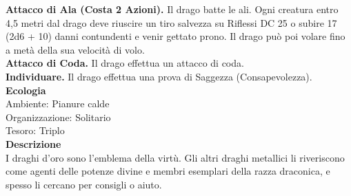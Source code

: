 \begin{multicols}{2}
\textbf{Attacco di Ala (Costa 2 Azioni).} Il drago batte le ali. Ogni creatura entro 4,5 metri dal drago deve riuscire un tiro salvezza su Riflessi DC 25 o subire 17 (2d6 + 10) danni contundenti e venir gettato prono. Il drago può poi volare fino a metà della sua velocità di volo.\\
\textbf{Attacco di Coda.} Il drago effettua un attacco di coda.\\
\textbf{Individuare.} Il drago effettua una prova di Saggezza (Consapevolezza).\\
\textbf{Ecologia}\\
Ambiente: Pianure calde\\
Organizzazione: Solitario\\
Tesoro: Triplo\\
\textbf{Descrizione}\\
I draghi d'oro sono l'emblema della virtù. Gli altri draghi metallici li riveriscono come agenti delle potenze divine e membri esemplari della razza draconica, e spesso li cercano per consigli o aiuto.\\


\end{multicols}
